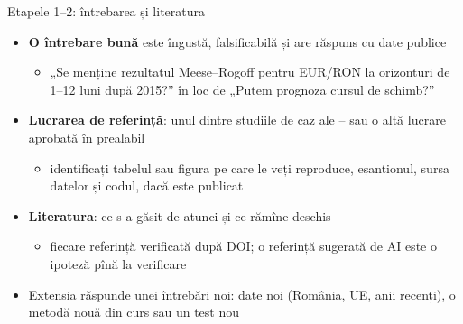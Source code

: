 \begin{frame}{Etapele 1--2: întrebarea și literatura}
\itemsize{\small}
\begin{itemize}
    \item \textbf{O întrebare bună} este îngustă, falsificabilă și are răspuns cu date publice
    \begin{itemize}
        \item „Se menține rezultatul Meese--Rogoff pentru EUR/RON la orizonturi de 1--12 luni după 2015?” în loc de „Putem prognoza cursul de schimb?”
    \end{itemize}
    \item \textbf{Lucrarea de referință}: unul dintre studiile de caz ale -- sau o altă lucrare aprobată în prealabil
    \begin{itemize}
        \item identificați tabelul sau figura pe care le veți reproduce, eșantionul, sursa datelor și codul, dacă este publicat
    \end{itemize}
    \item \textbf{Literatura}: ce s-a găsit de atunci și ce rămîne deschis
    \begin{itemize}
        \item fiecare referință verificată după DOI; o referință sugerată de AI este o ipoteză pînă la verificare 
    \end{itemize}
    \item Extensia răspunde unei întrebări noi: date noi (România, UE, anii recenți), o metodă nouă din curs sau un test nou
\end{itemize}
\end{frame}

